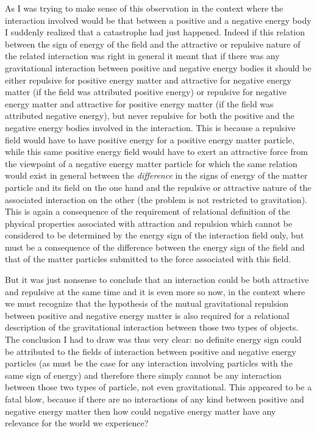 \documentclass[notitlepage,12pt]{report}
\begin{document}
As I was trying to make sense of this observation in the context where the interaction involved would be that between a positive and a negative energy body I suddenly realized that a catastrophe had just happened. Indeed if this relation between the sign of energy of the field and the attractive or repulsive nature of the related interaction was right in general it meant that if there was any gravitational interaction between positive and negative energy bodies it should be either repulsive for positive energy matter and attractive for negative energy matter (if the field was attributed positive energy) or repulsive for negative energy matter and attractive for positive energy matter (if the field was attributed negative energy), but never repulsive for both the positive and the negative energy bodies involved in the interaction. This is because a repulsive field would have to have positive energy for a positive energy matter particle, while this same positive energy field would have to exert an attractive force from the viewpoint of a negative energy matter particle for which the same relation would exist in general between the \textit{difference} in the signs of energy of the matter particle and its field on the one hand and the repulsive or attractive nature of the associated interaction on the other (the problem is not restricted to gravitation). This is again a consequence of the requirement of relational definition of the physical properties associated with attraction and repulsion which cannot be considered to be determined by the energy sign of the interaction field only, but must be a consequence of the difference between the energy sign of the field and that of the matter particles submitted to the force associated with this field.

But it was just nonsense to conclude that an interaction could be both attractive and repulsive at the same time and it is even more so now, in the context where we must recognize that the hypothesis of the mutual gravitational repulsion between positive and negative energy matter is also required for a relational description of the gravitational interaction between those two types of objects. The conclusion I had to draw was thus very clear: no definite energy sign could be attributed to the fields of interaction between positive and negative energy particles (as must be the case for any interaction involving particles with the same sign of energy) and therefore there simply cannot be any interaction between those two types of particle, not even gravitational. This appeared to be a fatal blow, because if there are no interactions of any kind between positive and negative energy matter then how could negative energy matter have any relevance for the world we experience?
\end{document}
